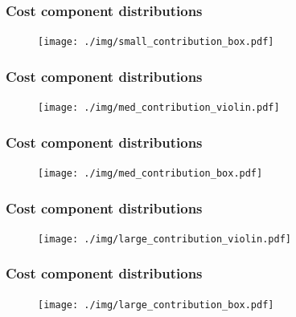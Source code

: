 \documentclass{beamer}
\begin{document}
\begin{frame}
    \frametitle{Cost component distributions}

    \begin{figure}
    \texttt{[image: ./img/small\_contribution\_box.pdf]}
    \end{figure}
\end{frame}

\begin{frame}
    \frametitle{Cost component distributions}

    \begin{figure}
    \texttt{[image: ./img/med\_contribution\_violin.pdf]}
    \end{figure}
\end{frame}

\begin{frame}
    \frametitle{Cost component distributions}

    \begin{figure}
    \texttt{[image: ./img/med\_contribution\_box.pdf]}
    \end{figure}
\end{frame}

\begin{frame}
    \frametitle{Cost component distributions}

    \begin{figure}
    \texttt{[image: ./img/large\_contribution\_violin.pdf]}
    \end{figure}
\end{frame}

\begin{frame}
    \frametitle{Cost component distributions}

    \begin{figure}
    \texttt{[image: ./img/large\_contribution\_box.pdf]}
    \end{figure}
\end{frame}
\end{document}
